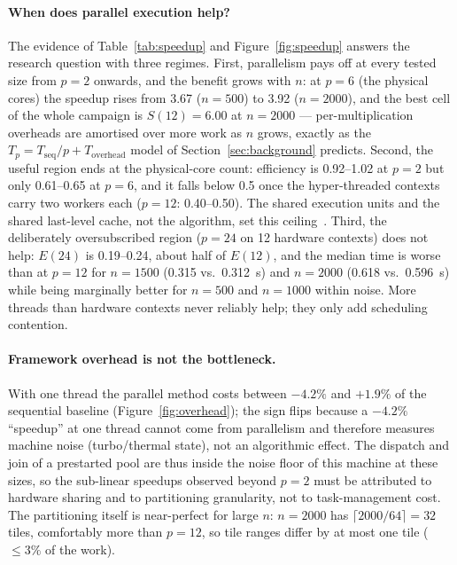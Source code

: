 \documentclass[11pt,a4paper]{article}
\begin{document}
\paragraph{When does parallel execution help?}
The evidence of Table~\ref{tab:speedup} and Figure~\ref{fig:speedup}
answers the research question with three regimes. First, parallelism pays
off at every tested size from $p = 2$ onwards, and the benefit grows with
$n$: at $p = 6$ (the physical cores) the speedup rises from 3.67
($n = 500$) to 3.92 ($n = 2000$), and the best cell of the whole campaign
is $S(12) = 6.00$ at $n = 2000$ --- per-multiplication overheads are
amortised over more work as $n$ grows, exactly as the
$T_p = T_{\mathrm{seq}}/p + T_{\mathrm{overhead}}$ model of
Section~\ref{sec:background} predicts. Second, the useful region ends at
the physical-core count: efficiency is 0.92--1.02 at $p = 2$ but only
0.61--0.65 at $p = 6$, and it falls below 0.5 once the hyper-threaded
contexts carry two workers each ($p = 12$: 0.40--0.50). The shared
execution units and the shared last-level cache, not the algorithm, set
this ceiling~\cite{hennessy2017}. Third, the deliberately oversubscribed
region ($p = 24$ on 12 hardware contexts) does not help: $E(24)$ is
0.19--0.24, about half of $E(12)$, and the median time is worse than at
$p = 12$ for $n = 1500$ (0.315 vs.\ 0.312~s) and $n = 2000$ (0.618 vs.\
0.596~s) while being marginally better for $n = 500$ and $n = 1000$
within noise. More threads than hardware contexts never reliably help;
they only add scheduling contention.

\paragraph{Framework overhead is not the bottleneck.}
With one thread the parallel method costs between $-4.2\%$ and $+1.9\%$
of the sequential baseline (Figure~\ref{fig:overhead}); the sign flips
because a $-4.2\%$ ``speedup'' at one thread cannot come from parallelism
and therefore measures machine noise (turbo/thermal state), not an
algorithmic effect. The dispatch and join of a prestarted pool are thus
inside the noise floor of this machine at these sizes, so the sub-linear
speedups observed beyond $p = 2$ must be attributed to hardware sharing
and to partitioning granularity, not to task-management cost. The
partitioning itself is near-perfect for large $n$: $n = 2000$ has
$\lceil 2000/64 \rceil = 32$ tiles, comfortably more than $p = 12$, so
tile ranges differ by at most one tile ($\le 3\%$ of the work).
\end{document}
